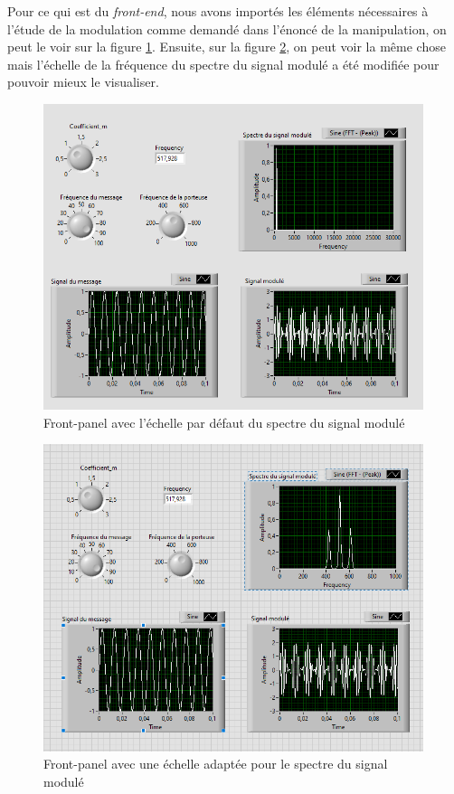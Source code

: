 \documentclass[a4paper]{article}
\begin{document}
Pour ce qui est du \textit{front-end}, nous avons importés les éléments nécessaires à l'étude de la modulation comme demandé dans l'énoncé de la manipulation, on peut le voir sur la figure \ref{fig:f3}. Ensuite, sur la figure \ref{fig:f4}, on peut voir la même chose mais l'échelle de la fréquence du spectre du signal modulé a été modifiée pour pouvoir mieux le visualiser.

\begin{figure}[H]
    \centering
    \includegraphics[width=0.99\textwidth]{images/Capture002.PNG}
    \caption{Front-panel avec l'échelle par défaut du spectre du signal modulé}
    \label{fig:f3}
\end{figure}

\begin{figure}[H]
    \centering
    \includegraphics[width=0.99\textwidth]{images/Capture004.PNG}
    \caption{Front-panel avec une échelle adaptée pour le spectre du signal modulé}
    \label{fig:f4}
\end{figure}
\end{document}
